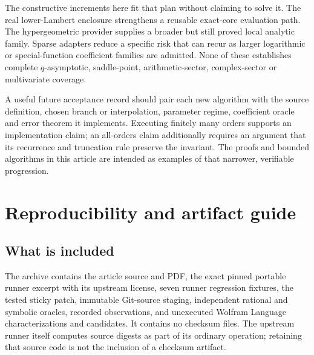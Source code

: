 \documentclass[11pt,letterpaper]{article}
\begin{document}
The constructive increments here fit that plan without claiming to solve it. The real lower-Lambert enclosure strengthens a reusable exact-core evaluation path. The hypergeometric provider supplies a broader but still proved local analytic family. Sparse adapters reduce a specific risk that can recur as larger logarithmic or special-function coefficient families are admitted. None of these establishes complete $q$-asymptotic, saddle-point, arithmetic-sector, complex-sector or multivariate coverage.

A useful future acceptance record should pair each new algorithm with the source definition, chosen branch or interpolation, parameter regime, coefficient oracle and error theorem it implements. Executing finitely many orders supports an implementation claim; an all-orders claim additionally requires an argument that its recurrence and truncation rule preserve the invariant. The proofs and bounded algorithms in this article are intended as examples of that narrower, verifiable progression.

\section{Reproducibility and artifact guide}
\subsection{What is included}

The archive contains the article source and PDF, the exact pinned portable runner excerpt with its upstream license, seven runner regression fixtures, the tested sticky patch, immutable Git-source staging, independent rational and symbolic oracles, recorded observations, and unexecuted Wolfram Language characterizations and candidates. It contains no checksum files. The upstream runner itself computes source digests as part of its ordinary operation; retaining that source code is not the inclusion of a checksum artifact.
\end{document}
